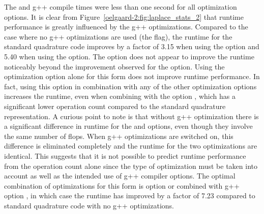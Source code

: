%
The \ffc{} and g++ compile times were less than one
second for all optimization options.  It is clear from
Figure~\ref{oelgaard-2:fig:laplace_stats_2} that runtime performance
is greatly influenced by the g++ optimizations.  Compared to the case
where no g++ optimizations are used (the  flag), the runtime for
the standard quadrature code improves by a factor of 3.15 when using the
 option and 5.40 when using the  option.
The  option does not appear to improve the runtime noticeably
beyond the improvement observed for the  option.
Using the \ffc{} optimization option  alone for this form
does not improve runtime performance.  In fact, using this option in
combination with any of the other optimization options increases the
runtime, even when combining with the option , which has
a significant lower operation count compared to the standard quadrature
representation.  A curious point to note is that without g++ optimization
there is a significant difference in runtime for the  and
 options, even though they involve the same number of flops.
When g++ optimizations are switched on, this difference is eliminated
completely and the runtime for the two \ffc{} optimizations are identical.
This suggests that it is not possible to predict runtime performance from
the operation count alone since the type of \ffc{} optimization must be
taken into account as well as the intended use of g++ compiler options.
The optimal combination of optimizations for this form is \ffc{} option
 or  combined with g++ option , in which
case the runtime has improved by a factor of 7.23 compared to standard
quadrature code with no g++ optimizations.

